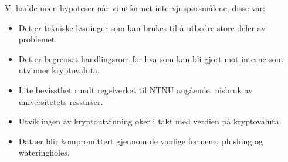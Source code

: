Vi hadde noen hypoteser når vi utformet intervjuspørsmålene, disse var:
\begin{itemize}
    \item Det er tekniske løsninger som kan brukes til å utbedre store deler av problemet.
    \item Det er begrenset handlingsrom for hva som kan bli gjort mot interne som utvinner kryptovaluta.
    \item Lite bevissthet rundt regelverket til NTNU angående misbruk av universitetets ressurser.
    \item Utviklingen av kryptoutvinning øker i takt med verdien på kryptovaluta.
    \item Dataer blir kompromittert gjennom de vanlige formene; phishing og wateringholes.
\end{itemize}

